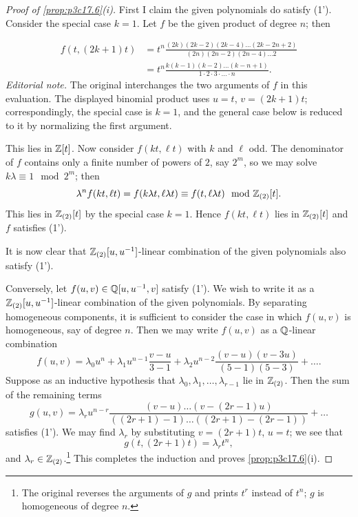 \documentclass[../main]{subfiles}
\begin{document}
\begin{proof}[Proof of \ref{prop:p3c17.6}(i)]
First I claim the given polynomials do satisfy (1'). Consider the special case $k=1$. Let $f$ be the given product of degree $n$; then

\begin{align*}
f(t,(2k+1)t)&=t^n\frac{(2k)(2k-2)(2k-4)\ldots(2k-2n+2)}{(2n)(2n-2)(2n-4)\ldots2}\\
&=t^n\frac{k(k-1)(k-2)\ldots(k-n+1)}{1\cdot2\cdot3\cdot\ldots\cdot n}.
\end{align*}
\noindent\textit{Editorial note.} The original interchanges the two arguments of $f$ in this evaluation. The displayed binomial product uses $u=t$, $v=(2k+1)t$; correspondingly, the special case is $k=1$, and the general case below is reduced to it by normalizing the first argument.

This lies in $\mathbb{Z}[t]$. Now consider $f(kt,\ell t)$ with $k$ and $\ell$ odd. The denominator of $f$ contains only a finite number of powers of $2$, say $2^m$, so we may solve $k\lambda\equiv1\mod2^m$; then
\[\lambda^nf(kt,\ell t)=f(k\lambda t,\ell\lambda t)\equiv f(t,\ell\lambda t)\mod{\mathbb{Z}}_{(2)}[t].\]
This lies in $\mathbb{Z}_{(2)}[t]$ by the special case $k=1$. Hence $f(kt,\ell t)$ lies in $\mathbb{Z}_{(2)}[t]$ and $f$ satisfies (1').

It is now clear that $\mathbb{Z}_{(2)}[u, u^{-1}]$-linear combination of the given polynomials also satisfy (1').

Conversely, let $f(u,v)\in\mathbb{Q}[u,u^{-1},v]$ satisfy (1'). We wish to write it as a $\mathbb{Z}_{(2)}[u,u^{-1}]$-linear combination of the given polynomials. By separating homogeneous components, it is sufficient to consider the case in which $f(u,v)$ is homogeneous, say of degree $n$. Then we may write $f(u,v)$ as a $\mathbb{Q}$-linear combination
\[f(u,v)=\lambda_0u^n+\lambda_1u^{n-1}\frac{v-u}{3-1}+\lambda_2u^{n-2}\frac{(v-u)(v-3u)}{(5-1)(5-3)}+\ldots.\]
Suppose as an inductive hypothesis that $\lambda_0,\lambda_1,\ldots,\lambda_{r-1}$ lie in $\mathbb{Z}_{(2)}$. Then the sum of the remaining terms
\[g(u,v)=\lambda_ru^{n-r}\frac{(v-u)\ldots(v-(2r-1)u)}{((2r+1)-1)\ldots((2r+1)-(2r-1))}+\ldots\]
satisfies (1'). We may find $\lambda_r$ by substituting $v=(2r+1)t$, $u=t$; we see that
\[g(t,(2r+1)t)=\lambda_rt^n,\]
and $\lambda_r\in\mathbb{Z}_{(2)}$.\footnote{The original reverses the arguments of $g$ and prints $t^r$ instead of $t^n$; $g$ is homogeneous of degree $n$.} This completes the induction and proves \ref{prop:p3c17.6}(i).
\end{proof}
\end{document}
